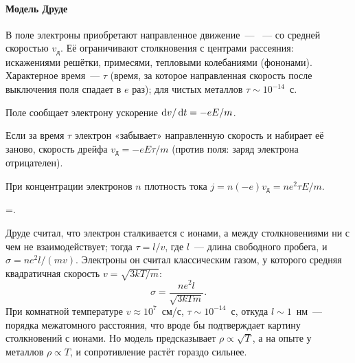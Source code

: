 \paragraph{Модель Друде}
В поле электроны приобретают направленное движение~— ~— со
средней скоростью $v_\text{д}$. Её ограничивают столкновения с
центрами рассеяния: искажениями решётки, примесями, тепловыми
колебаниями (фононами). Характерное время~— 
$\tau$ (время, за которое направленная скорость после выключения поля
спадает в $e$ раз); для чистых металлов $\tau\sim10^{-14}$~с.
\begin{shagi}
\item Поле сообщает электрону ускорение $\mathop{}\!\mathrm{d} v/\mathop{}\!\mathrm{d} t=-eE/m$.
\item Если за время $\tau$ электрон «забывает» направленную скорость и
набирает её заново, скорость дрейфа $v_\text{д}=-eE\tau/m$ (против поля:
заряд электрона отрицателен).
\item При концентрации электронов $n$ плотность тока
$j=n(-e)v_\text{д}=ne^2\tau E/m$.
\end{shagi}
\begin{keyeq}\label{eq:drude}
\sigma=.
\end{keyeq}
Друде считал, что электрон сталкивается с ионами, а между
столкновениями ни с чем не взаимодействует; тогда $\tau=l/v$, где $l$~—
длина свободного пробега, и $\sigma=ne^2l/(mv)$. Электроны он считал
классическим газом, у которого средняя квадратичная скорость
$v=\sqrt{3kT/m}$:
\[
\sigma=\frac{ne^2l}{\sqrt{3kTm}} .
\]
При комнатной температуре $v\approx10^7$~см/с, $\tau\sim10^{-14}$~с,
откуда $l\sim1$~нм~— порядка межатомного расстояния, что вроде бы подтверждает картину
столкновений с ионами. Но модель предсказывает $\rho\propto\sqrt T$, а на
опыте у металлов $\rho\propto T$, и сопротивление растёт гораздо
сильнее.

